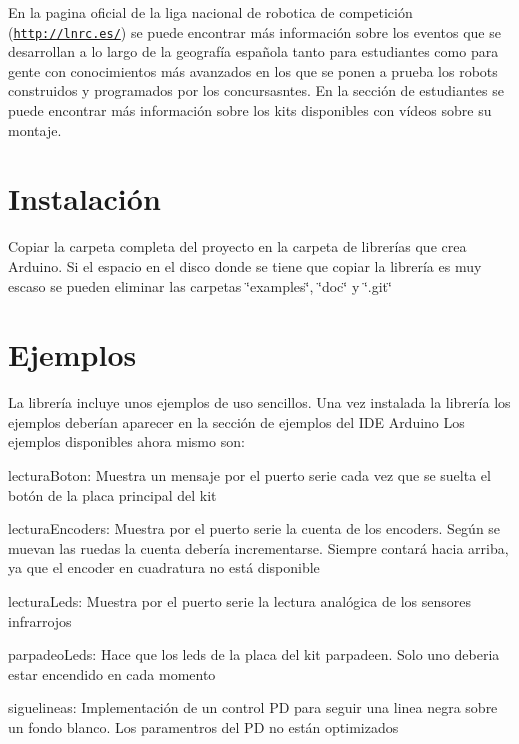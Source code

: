 En la pagina oficial de la liga nacional de robotica de competición (\href{http://lnrc.es/}{\tt http\-://lnrc.\-es/}) se puede encontrar más información sobre los eventos que se desarrollan a lo largo de la geografía española tanto para estudiantes como para gente con conocimientos más avanzados en los que se ponen a prueba los robots construidos y programados por los concursasntes. En la sección de estudiantes se puede encontrar más información sobre los kits disponibles con vídeos sobre su montaje.\hypertarget{index_install_sec}{}\section{Instalación}\label{index_install_sec}
Copiar la carpeta completa del proyecto en la carpeta de librerías que crea Arduino. Si el espacio en el disco donde se tiene que copiar la librería es muy escaso se pueden eliminar las carpetas \char`\"{}examples\char`\"{}, \char`\"{}doc\char`\"{} y \char`\"{}.\-git\char`\"{}\hypertarget{index_examples}{}\section{Ejemplos}\label{index_examples}
La librería incluye unos ejemplos de uso sencillos. Una vez instalada la librería los ejemplos deberían aparecer en la sección de ejemplos del I\-D\-E Arduino Los ejemplos disponibles ahora mismo son\-:
\begin{DoxyItemize}
\item lectura\-Boton\-: Muestra un mensaje por el puerto serie cada vez que se suelta el botón de la placa principal del kit
\item lectura\-Encoders\-: Muestra por el puerto serie la cuenta de los encoders. Según se muevan las ruedas la cuenta debería incrementarse. Siempre contará hacia arriba, ya que el encoder en cuadratura no está disponible
\item lectura\-Leds\-: Muestra por el puerto serie la lectura analógica de los sensores infrarrojos
\item parpadeo\-Leds\-: Hace que los leds de la placa del kit parpadeen. Solo uno deberia estar encendido en cada momento
\item siguelineas\-: Implementación de un control P\-D para seguir una linea negra sobre un fondo blanco. Los paramentros del P\-D no están optimizados 
\end{DoxyItemize}